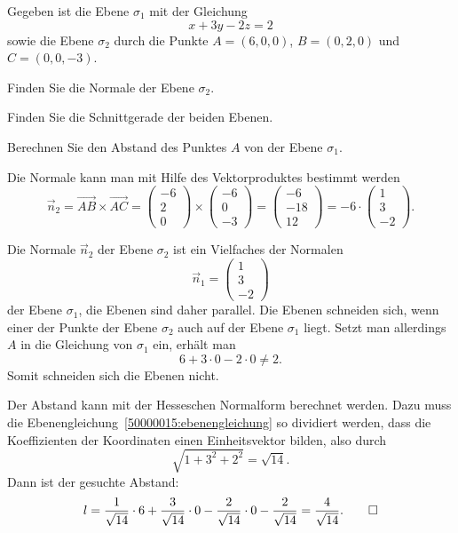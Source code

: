 Gegeben ist die Ebene $\sigma_1$ mit der Gleichung
\begin{equation}
x+3y-2z=2
\label{50000015:ebenengleichung}
\end{equation}
sowie die Ebene $\sigma_2$ durch die Punkte $A=(6,0,0)$, $B=(0,2,0)$ und
$C=(0,0,-3)$.
\begin{teilaufgaben}
\item
Finden Sie die Normale der Ebene $\sigma_2$.
\item 
Finden Sie die Schnittgerade der beiden Ebenen.
\item 
Berechnen Sie den Abstand des Punktes $A$ von der Ebene $\sigma_1$.
\end{teilaufgaben}


\begin{loesung}
\begin{teilaufgaben}
\item
Die Normale kann man mit Hilfe des Vektorproduktes bestimmt werden
\[
\vec{n}_2
=
\overrightarrow{AB}\times\overrightarrow{AC}
=
\begin{pmatrix}
-6\\
 2\\
 0
\end{pmatrix}
\times
\begin{pmatrix}
-6\\
 0\\
-3
\end{pmatrix}
=
\begin{pmatrix}
-6\\
-18\\
12
\end{pmatrix}
=
-6\cdot\begin{pmatrix}
1\\
3\\
-2
\end{pmatrix}.
\]
\item
Die Normale $\vec{n}_2$ der Ebene $\sigma_2$ ist ein Vielfaches der
Normalen
\[
\vec{n}_1=\begin{pmatrix}1\\3\\-2\end{pmatrix}
\]
der Ebene $\sigma_1$, die Ebenen sind daher parallel.
Die Ebenen schneiden sich, wenn einer der Punkte der Ebene $\sigma_2$ auch
auf der Ebene $\sigma_1$ liegt. 
Setzt man allerdings $A$ in die Gleichung von $\sigma_1$ ein, erhält man
\[
6+3\cdot 0-2\cdot 0 \ne 2.
\]
Somit schneiden sich die Ebenen nicht.
\item
Der Abstand kann mit der Hesseschen Normalform berechnet werden.
Dazu muss die Ebenengleichung~\eqref{50000015:ebenengleichung}
so dividiert werden, dass die Koeffizienten der Koordinaten einen
Einheitsvektor bilden, also durch
\[
\sqrt{1+3^2+2^2}=\sqrt{14}.
\]
Dann ist der gesuchte Abstand:
\[
l
=
\frac1{\sqrt{14}}\cdot 6
+\frac3{\sqrt{14}}\cdot 0
-\frac2{\sqrt{14}}\cdot 0
-\frac2{\sqrt{14}}
=
\frac4{\sqrt{14}}.
\qedhere
\]
\end{teilaufgaben}
\end{loesung}


